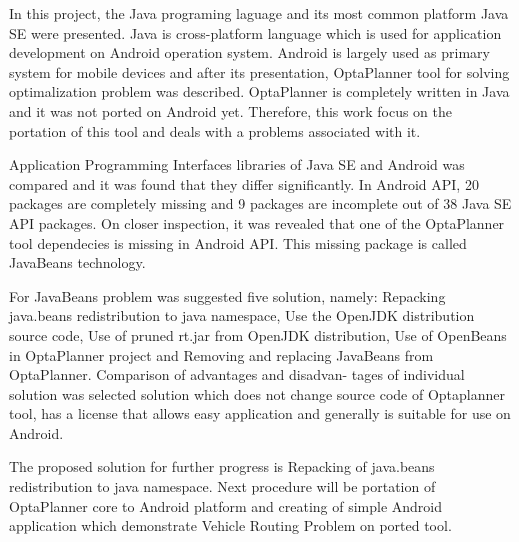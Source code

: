 In this project, the Java programing laguage and its most common platform Java SE were presented. Java is cross-platform language which is used for application development on Android operation system. Android is largely used as primary system for mobile devices and after its presentation, OptaPlanner tool for solving optimalization problem was described. OptaPlanner is completely written in Java and it was not ported on Android yet. Therefore, this work focus on the portation of this tool and deals with a problems associated with it.

Application Programming Interfaces libraries of Java SE and Android was compared and it was found that they differ significantly. In Android API, 20 packages are completely missing and 9 packages are incomplete out of 38 Java SE API packages. On closer inspection, it was revealed that one of the OptaPlanner tool dependecies is missing in Android API. This missing package is called JavaBeans technology.

For JavaBeans problem was suggested five solution, namely: Repacking java.beans redistribution to java namespace, Use the OpenJDK distribution source code, Use of pruned rt.jar from OpenJDK distribution, Use of OpenBeans in OptaPlanner project and Removing and replacing JavaBeans from OptaPlanner. Comparison of advantages and disadvan-
tages of individual solution was selected solution which does not change source code of Optaplanner tool, has a license that allows easy application and generally is suitable for use on Android.

The proposed solution for further progress is Repacking of java.beans redistribution to java namespace. Next procedure will be portation of OptaPlanner core to Android platform and creating of simple Android application which demonstrate Vehicle Routing Problem on ported tool. 
